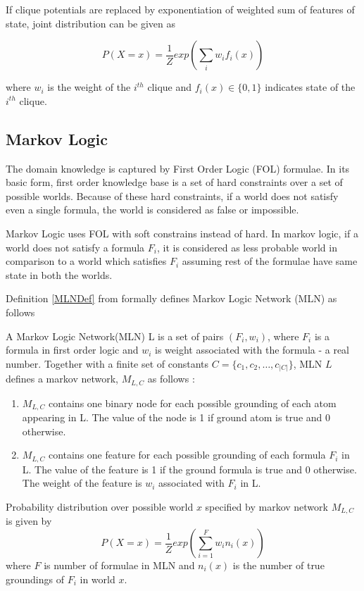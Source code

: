 If clique potentials are replaced by exponentiation of weighted sum of features of state,
joint distribution can be given as

\begin{equation}
	\label{jointDistWeighted}
	P(X = x) = \frac{1}{Z} exp \left( \displaystyle \sum_i w_i f_i(x) \right)
\end{equation}

where $w_i$ is the weight of the $i^{th}$ clique and $f_i(x) \in \{0,1\}$ indicates state 
of the $i^{th}$ clique.

\subsection{Markov Logic}
The domain knowledge is captured by First Order Logic (FOL) formulae. In its basic form, 
first order knowledge base is a set of hard constraints over a set of possible worlds.
Because of these hard constraints, if a world does not satisfy even a single formula,
the world is considered as false or impossible.

Markov Logic uses FOL with soft constrains instead of hard. In markov logic, if a world
does not satisfy a formula $F_i$, it is considered as less probable world in comparison to a
world which satisfies $F_i$ assuming rest of the formulae have same state in both the worlds.

Definition \ref{MLNDef} from \cite{MarkovLogic} formally defines 
Markov Logic Network (MLN) as follows

\begin{defn}
	\label{MLNDef}
	A Markov Logic Network(MLN) L is a set of pairs $(F_i, w_i)$, where $F_i$ is a
	formula in first order logic and $w_i$ is weight associated with the formula - a real number.
	Together with a finite set of constants $C = \{c_1, c_2,\ldots,c_{|C|}\}$, MLN $L$
	defines a markov network, $M_{L,C}$ as follows :

	\begin{enumerate}
		\item $M_{L,C}$ contains one binary node for each possible grounding
			of each atom appearing in L. The value of the node is 1 if ground
			atom is true and 0 otherwise.
		\item $M_{L,C}$ contains one feature for each possible grounding of each
			formula $F_i$ in L. The value of the feature is 1 if the ground
			formula is true and 0 otherwise. The weight of the feature is
			$w_i$ associated with $F_i$ in L.
	\end{enumerate}
\end{defn}

Probability distribution over possible world $x$ specified by markov network $M_{L,C}$ is given by
\begin{equation}
	\label{jointDistMLN}
	P(X = x) = \frac{1}{Z} exp \left( \displaystyle \sum_{i = 1}^{F} w_i n_i(x)  \right)
\end{equation}
where $F$ is number of formulae in MLN and $n_i(x)$ is the number of true groundings of
$F_i$ in world $x$.
